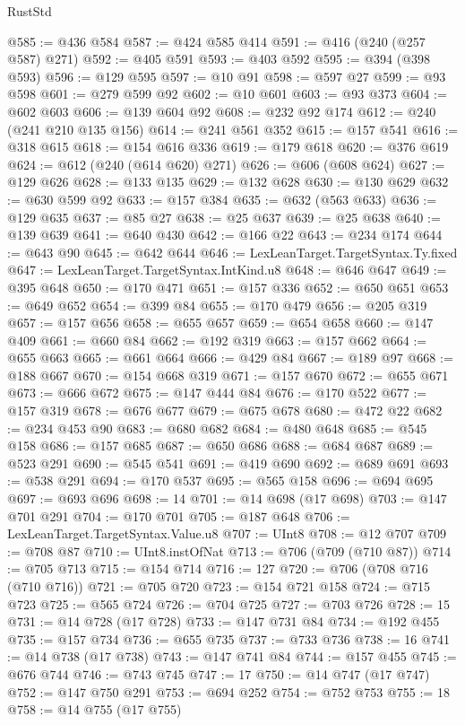 \begin{lexlean}{RustStd}
\begin{coremodule}
@585 := @436 @584
@587 := @424 @585 @414
@591 := @416 (@240 (@257 @587) @271)
@592 := @405 @591
@593 := @403 @592
@595 := @394 (@398 @593)
@596 := @129 @595
@597 := @10 @91
@598 := @597 @27
@599 := @93 @598
@601 := @279 @599 @92
@602 := @10 @601
@603 := @93 @373
@604 := @602 @603
@606 := @139 @604 @92
@608 := @232 @92 @174
@612 := @240 (@241 @210 @135 @156)
@614 := @241 @561 @352
@615 := @157 @541
@616 := @318 @615
@618 := @154 @616 @336
@619 := @179 @618
@620 := @376 @619
@624 := @612 (@240 (@614 @620) @271)
@626 := @606 (@608 @624)
@627 := @129 @626
@628 := @133 @135
@629 := @132 @628
@630 := @130 @629
@632 := @630 @599 @92
@633 := @157 @384
@635 := @632 (@563 @633)
@636 := @129 @635
@637 := @85 @27
@638 := @25 @637
@639 := @25 @638
@640 := @139 @639
@641 := @640 @430
@642 := @166 @22
@643 := @234 @174
@644 := @643 @90
@645 := @642 @644
@646 := LexLeanTarget.TargetSyntax.Ty.fixed
@647 := LexLeanTarget.TargetSyntax.IntKind.u8
@648 := @646 @647
@649 := @395 @648
@650 := @170 @471
@651 := @157 @336
@652 := @650 @651
@653 := @649 @652
@654 := @399 @84
@655 := @170 @479
@656 := @205 @319
@657 := @157 @656
@658 := @655 @657
@659 := @654 @658
@660 := @147 @409
@661 := @660 @84
@662 := @192 @319
@663 := @157 @662
@664 := @655 @663
@665 := @661 @664
@666 := @429 @84
@667 := @189 @97
@668 := @188 @667
@670 := @154 @668 @319
@671 := @157 @670
@672 := @655 @671
@673 := @666 @672
@675 := @147 @444 @84
@676 := @170 @522
@677 := @157 @319
@678 := @676 @677
@679 := @675 @678
@680 := @472 @22
@682 := @234 @453 @90
@683 := @680 @682
@684 := @480 @648
@685 := @545 @158
@686 := @157 @685
@687 := @650 @686
@688 := @684 @687
@689 := @523 @291
@690 := @545 @541
@691 := @419 @690
@692 := @689 @691
@693 := @538 @291
@694 := @170 @537
@695 := @565 @158
@696 := @694 @695
@697 := @693 @696
@698 := 14
@701 := @14 @698 (@17 @698)
@703 := @147 @701 @291
@704 := @170 @701
@705 := @187 @648
@706 := LexLeanTarget.TargetSyntax.Value.u8
@707 := UInt8
@708 := @12 @707
@709 := @708 @87
@710 := UInt8.instOfNat
@713 := @706 (@709 (@710 @87))
@714 := @705 @713
@715 := @154 @714
@716 := 127
@720 := @706 (@708 @716 (@710 @716))
@721 := @705 @720
@723 := @154 @721 @158
@724 := @715 @723
@725 := @565 @724
@726 := @704 @725
@727 := @703 @726
@728 := 15
@731 := @14 @728 (@17 @728)
@733 := @147 @731 @84
@734 := @192 @455
@735 := @157 @734
@736 := @655 @735
@737 := @733 @736
@738 := 16
@741 := @14 @738 (@17 @738)
@743 := @147 @741 @84
@744 := @157 @455
@745 := @676 @744
@746 := @743 @745
@747 := 17
@750 := @14 @747 (@17 @747)
@752 := @147 @750 @291
@753 := @694 @252
@754 := @752 @753
@755 := 18
@758 := @14 @755 (@17 @755)

\end{coremodule}
\end{lexlean}
